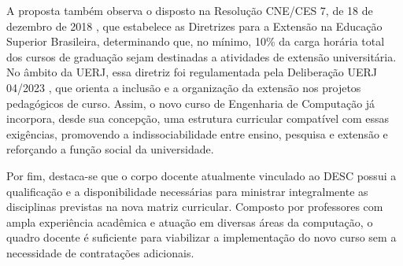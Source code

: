 A proposta também observa o disposto na Resolução CNE/CES  7, de 18 de dezembro de 2018 \cite{cne2018}, que estabelece as Diretrizes para a Extensão na Educação Superior Brasileira, determinando que, no mínimo, 10\% da carga horária total dos cursos de graduação sejam destinadas a atividades de extensão universitária. No âmbito da UERJ, essa diretriz foi regulamentada pela Deliberação UERJ  04/2023 \cite{uerj2023}, que orienta a inclusão e a organização da extensão nos projetos pedagógicos de curso. Assim, o novo curso de Engenharia de Computação já incorpora, desde sua concepção, uma estrutura curricular compatível com essas exigências, promovendo a indissociabilidade entre ensino, pesquisa e extensão e reforçando a função social da universidade.

Por fim, destaca-se que o corpo docente atualmente vinculado ao DESC possui a qualificação e a disponibilidade necessárias para ministrar integralmente as disciplinas previstas na nova matriz curricular. Composto por professores com ampla experiência acadêmica e atuação em diversas áreas da computação, o quadro docente é suficiente para viabilizar a implementação do novo curso sem a necessidade de contratações adicionais.
